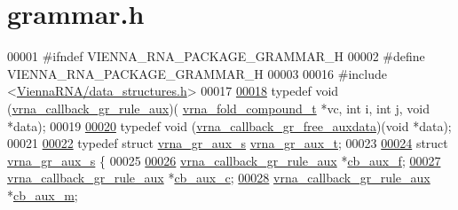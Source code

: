 \hypertarget{grammar_8h_source}{}\section{grammar.\+h}
\label{grammar_8h_source}

\begin{DoxyCode}
00001 \textcolor{preprocessor}{#ifndef VIENNA\_RNA\_PACKAGE\_GRAMMAR\_H}
00002 \textcolor{preprocessor}{#define VIENNA\_RNA\_PACKAGE\_GRAMMAR\_H}
00003 
00016 \textcolor{preprocessor}{#include <\mbox{\hyperlink{data__structures_8h}{ViennaRNA/data\_structures.h}}>}
00017 
\mbox{\hyperlink{group__grammar_ga4872800fb64a0cc6d861f53efb91ee05}{00018}} \textcolor{keyword}{typedef} void (\mbox{\hyperlink{group__grammar_ga4872800fb64a0cc6d861f53efb91ee05}{vrna\_callback\_gr\_rule\_aux}})(
      \mbox{\hyperlink{group__fold__compound_structvrna__fc__s}{vrna\_fold\_compound\_t}} *vc, \textcolor{keywordtype}{int} i, \textcolor{keywordtype}{int} j, \textcolor{keywordtype}{void} *data);
00019 
\mbox{\hyperlink{group__grammar_gadc8bec7146fda1ee9276df8fc22d8639}{00020}} \textcolor{keyword}{typedef} void (\mbox{\hyperlink{group__grammar_gadc8bec7146fda1ee9276df8fc22d8639}{vrna\_callback\_gr\_free\_auxdata}})(\textcolor{keywordtype}{void} *data);
00021 
\mbox{\hyperlink{group__grammar_ga8825fbe6d7de2ff61c232cc7550a82cc}{00022}} \textcolor{keyword}{typedef} \textcolor{keyword}{struct }\mbox{\hyperlink{group__grammar_structvrna__gr__aux__s}{vrna\_gr\_aux\_s}}  \mbox{\hyperlink{group__grammar_structvrna__gr__aux__s}{vrna\_gr\_aux\_t}};
00023 
\mbox{\hyperlink{group__grammar}{00024}} \textcolor{keyword}{struct }\mbox{\hyperlink{group__grammar_structvrna__gr__aux__s}{vrna\_gr\_aux\_s}} \{
00025 
\mbox{\hyperlink{group__grammar_a177c06df7c9632acd61e833671e128a4}{00026}}   \mbox{\hyperlink{group__grammar_ga4872800fb64a0cc6d861f53efb91ee05}{vrna\_callback\_gr\_rule\_aux}}     *\mbox{\hyperlink{group__grammar_a177c06df7c9632acd61e833671e128a4}{cb\_aux\_f}};
\mbox{\hyperlink{group__grammar_a6437d8207d52503cfeeec87666652faf}{00027}}   \mbox{\hyperlink{group__grammar_ga4872800fb64a0cc6d861f53efb91ee05}{vrna\_callback\_gr\_rule\_aux}}     *\mbox{\hyperlink{group__grammar_a6437d8207d52503cfeeec87666652faf}{cb\_aux\_c}};
\mbox{\hyperlink{group__grammar_a56558a56dc06c22667bda4ce2a2ddc57}{00028}}   \mbox{\hyperlink{group__grammar_ga4872800fb64a0cc6d861f53efb91ee05}{vrna\_callback\_gr\_rule\_aux}}     *\mbox{\hyperlink{group__grammar_a56558a56dc06c22667bda4ce2a2ddc57}{cb\_aux\_m}};

\end{DoxyCode}
